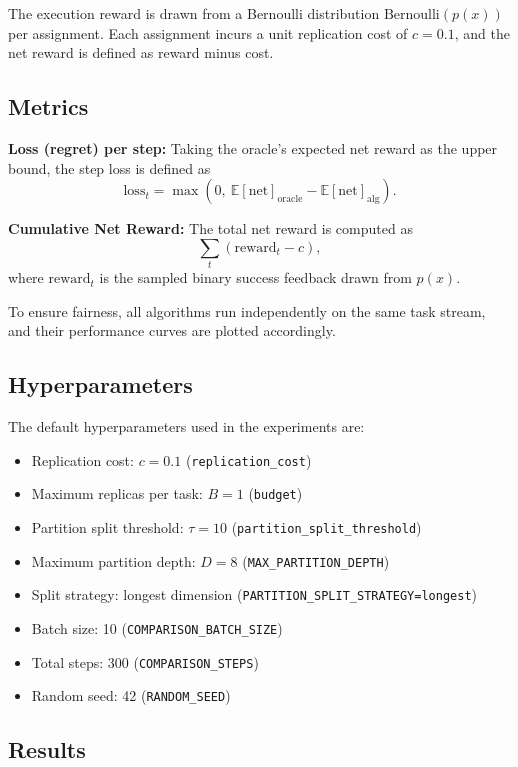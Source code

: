 The execution reward is drawn from a Bernoulli distribution $\text{Bernoulli}(p(x))$ per assignment. Each assignment incurs a unit replication cost of $c=0.1$, and the net reward is defined as reward minus cost.

\subsection{Metrics}

\textbf{Loss (regret) per step:} Taking the oracle’s expected net reward as the upper bound, the step loss is defined as
\[
\text{loss}_t = \max\left(0, \ \mathbb{E}[\text{net}]_{\text{oracle}} - \mathbb{E}[\text{net}]_{\text{alg}}\right).
\]

\textbf{Cumulative Net Reward:} The total net reward is computed as
\[
\sum_{t} (\text{reward}_t - c),
\]
where $\text{reward}_t$ is the sampled binary success feedback drawn from $p(x)$.

To ensure fairness, all algorithms run independently on the same task stream, and their performance curves are plotted accordingly.

\subsection{Hyperparameters}

The default hyperparameters used in the experiments are:

\begin{itemize}
    \item Replication cost: $c = 0.1$ (\texttt{replication\_cost})
    \item Maximum replicas per task: $B = 1$ (\texttt{budget})
    \item Partition split threshold: $\tau = 10$ (\texttt{partition\_split\_threshold})
    \item Maximum partition depth: $D = 8$ (\texttt{MAX\_PARTITION\_DEPTH})
    \item Split strategy: longest dimension (\texttt{PARTITION\_SPLIT\_STRATEGY=longest})
    \item Batch size: 10 (\texttt{COMPARISON\_BATCH\_SIZE})
    \item Total steps: 300 (\texttt{COMPARISON\_STEPS})
    \item Random seed: 42 (\texttt{RANDOM\_SEED})
\end{itemize}

\subsection{Results}

